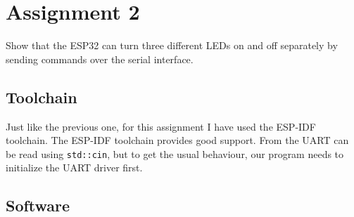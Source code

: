 
\section{Assignment 2}
Show that the ESP32 can turn three different LEDs on and off separately by sending commands over the serial interface.

\subsection{Toolchain}
Just like the previous one, for this assignment I have used the ESP-IDF toolchain.
The ESP-IDF toolchain provides good \cpluspluslogo{} support.
From the UART can be read using \texttt{std::cin}, but to get the usual behaviour, our program needs to initialize the UART driver first.

\clearpage
\subsection{Software}
\inputminted{cpp}{../leds-uart/main/leds-uart.cpp}

